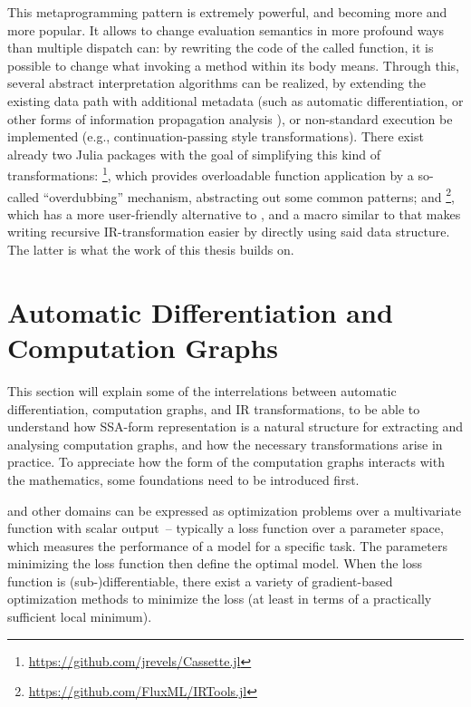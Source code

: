 This metaprogramming pattern is extremely powerful, and becoming more and more popular.  It allows
to change evaluation semantics in more profound ways than multiple dispatch can: by rewriting the
code of the called function, it is possible to change what invoking a method within its body means.
Through this, several abstract interpretation algorithms can be realized, by extending the existing
data path with additional metadata (such as automatic differentiation, or other forms of information
propagation analysis \parencite[part II]{singer2018static}), or non-standard execution be
implemented (e.g., continuation-passing style transformations).  There exist already two Julia
packages with the goal of simplifying this kind of transformations:
\footnote{\protect\url{https://github.com/jrevels/Cassette.jl}}, which
provides overloadable function application by a so-called \enquote{overdubbing} mechanism,
abstracting out some common patterns; and
\footnote{\protect\url{https://github.com/FluxML/IRTools.jl}}, which has a
more user-friendly alternative to , and a macro similar to  that
makes writing recursive IR-transformation easier by directly using said data structure.  The latter
is what the work of this thesis builds on.


\section[Automatic Differentiation and Computation Graphs]{Automatic Differentiation and \newline
  Computation Graphs}
\label{sec:cg-ad}

This section will explain some of the interrelations between automatic differentiation, computation
graphs, and IR transformations, to be able to understand how SSA-form representation is a natural
structure for extracting and analysing computation graphs, and how the necessary transformations
arise in practice.  To appreciate how the form of the computation graphs interacts with the
mathematics, some foundations need to be introduced first.

 and other domains can be expressed as optimization
problems over a multivariate function with scalar output~-- typically a loss function over a
parameter space, which measures the performance of a model for a specific task.  The parameters
minimizing the loss function then define the optimal model.  When the loss function is
(sub-)differentiable, there exist a variety of gradient-based optimization methods to minimize the
loss (at least in terms of a practically sufficient local minimum).

